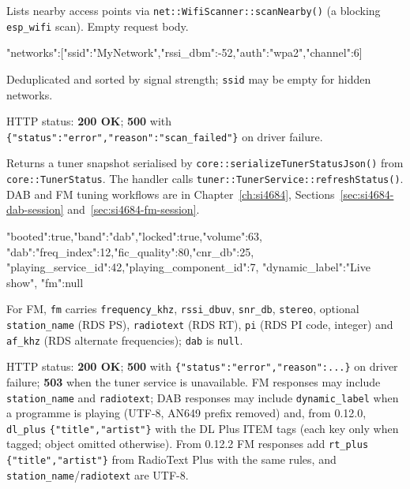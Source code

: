 Lists nearby access points via \texttt{net::WifiScanner::scanNearby()} (a
blocking \texttt{esp\_wifi} scan). Empty request body.

\begin{drnote}
\begin{drcode}[JSON]
{"networks":[{"ssid":"MyNetwork","rssi_dbm":-52,"auth":"wpa2","channel":6}]}
\end{drcode}
Deduplicated and sorted by signal strength; \texttt{ssid} may be empty for
hidden networks.
\end{drnote}

HTTP status: \textbf{200 OK}; \textbf{500} with
\texttt{\{"status":"error","reason":"scan\_failed"\}} on driver failure.

\label{sec:api-tuner-status}

Returns a tuner snapshot serialised by
\texttt{core::serializeTunerStatusJson()} from \texttt{core::TunerStatus}.
The handler calls \texttt{tuner::TunerService::refreshStatus()}. DAB and FM
tuning workflows are in Chapter~\ref{ch:si4684}, Sections~\ref{sec:si4684-dab-session}
and~\ref{sec:si4684-fm-session}.

\begin{drnote}
\begin{drcode}[JSON]
{"booted":true,"band":"dab","locked":true,"volume":63,
 "dab":{"freq_index":12,"fic_quality":80,"cnr_db":25,
        "playing_service_id":42,"playing_component_id":7,
        "dynamic_label":"Live show"},
 "fm":null}
\end{drcode}
For FM, \texttt{fm} carries \texttt{frequency\_khz}, \texttt{rssi\_dbuv},
\texttt{snr\_db}, \texttt{stereo}, optional \texttt{station\_name} (RDS PS),
\texttt{radiotext} (RDS RT), \texttt{pi} (RDS PI code, integer) and
\texttt{af\_khz} (RDS alternate frequencies); \texttt{dab} is \texttt{null}.
\end{drnote}

HTTP status: \textbf{200 OK}; \textbf{500} with
\texttt{\{"status":"error","reason":...\}} on driver failure;
\textbf{503} when the tuner service is unavailable. FM responses may include
\texttt{station\_name} and \texttt{radiotext}; DAB responses may include
\texttt{dynamic\_label} when a programme is playing (UTF-8, AN649 prefix
removed) and, from 0.12.0, \texttt{dl\_plus}
\texttt{\{"title","artist"\}} with the DL Plus ITEM tags (each key only
when tagged; object omitted otherwise). From 0.12.2 FM responses add
\texttt{rt\_plus} \texttt{\{"title","artist"\}} from RadioText Plus with
the same rules, and \texttt{station\_name}/\texttt{radiotext} are UTF-8.

